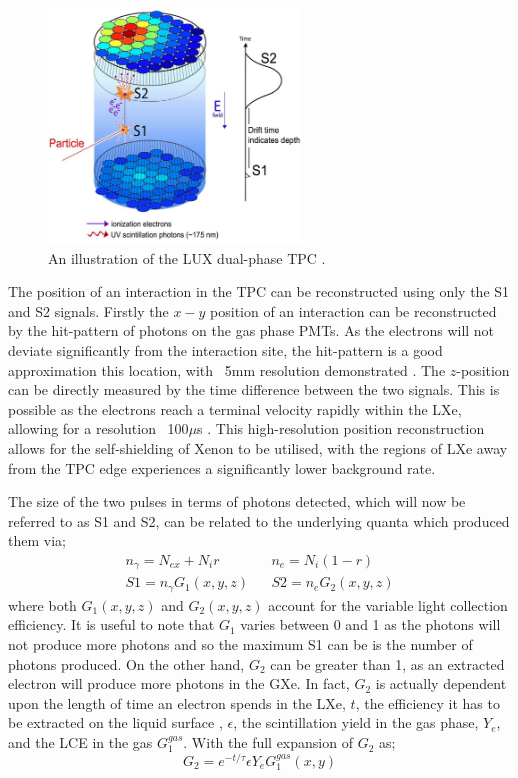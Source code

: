 \begin{figure}
    \centering
    \includegraphics[width=0.6\textwidth]{Figures/LZ/tpc_theory.png}
    \caption{An illustration of the LUX dual-phase TPC \cite{lux_ref}.}
    \label{fig:TPC_theory}
\end{figure}

\par
The position of an interaction in the TPC can be reconstructed using only the S1 and S2 signals.
Firstly the $x-y$ position of an interaction can be reconstructed by the hit-pattern of photons on the gas phase PMTs. 
As the electrons will not deviate significantly from the interaction site, the hit-pattern is a good approximation this location, with ~5mm resolution demonstrated \cite{lux_position_reconstruction_ref}.
The $z$-position can be directly measured by the time difference between the two signals.
This is possible as the electrons reach a terminal velocity rapidly within the LXe, allowing for a resolution ~100$\mu$s \cite{LZ_TechnicalDesignReview_ref}.
This high-resolution position reconstruction allows for the self-shielding of Xenon to be utilised, with the regions of LXe away from the TPC edge experiences a significantly lower background rate.

\par
The size of the two pulses in terms of photons detected, which will now be referred to as S1 and S2, can be related to the underlying quanta which produced them via;
\begin{align}
    n_\gamma = N_{ex} + N_i r && n_e = N_i (1-r) \\
    S1 = n_\gamma G_1(x,y,z) && S2 = n_e G_2(x,y,z)
\end{align}
where both $G_1(x,y,z)$ and $G_2(x,y,z)$ account for the variable light collection efficiency.
It is useful to note that $G_1$ varies between 0 and 1 as the photons will not produce more photons and so the maximum S1 can be is the number of photons produced.
On the other hand, $G_2$ can be greater than 1, as an extracted electron will produce more photons in the GXe.
In fact, $G_2$ is actually dependent upon the length of time an electron spends in the LXe, $t$, the efficiency it has to be extracted on the liquid surface , $\epsilon$, the scintillation yield in the gas phase, $Y_e$, and the LCE in the gas $G_1^{gas}$.
With the full expansion of $G_2$ as;
\begin{equation}
    G_2 = e^{-t/\tau} \epsilon Y_e G_1^{gas}(x,y)
\end{equation}

